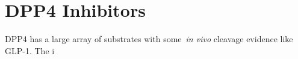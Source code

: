 \section{DPP4 Inhibitors}
DPP4 has a large array of substrates with some~\textit{in vivo} cleavage evidence like GLP-1. The i
